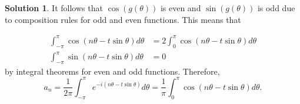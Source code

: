\documentclass[12pt]{article}
\theoremstyle{definition}
\newtheorem{sol}{Solution}
\theoremstyle{remark}
\begin{document}
\begin{sol}
It follows that $\cos(g(\theta))$ is even and $\sin(g(\theta))$ is odd due to composition rules for odd and even functions. This means that

\begin{align}
    \int_{-\pi}^\pi \cos ( n\theta - t\sin\theta )d\theta &= 2 \int_{0}^\pi \cos ( n\theta - t\sin\theta )d\theta \\
    \int_{-\pi}^{\pi} \sin( n\theta - t\sin\theta ) d\theta &= 0 
\end{align}
by integral theorems for even and odd functions. Therefore,
\begin{equation}
    a_n = \frac{1}{2\pi} \int_{-\pi}^\pi e^{-i(n\theta - t\sin\theta)}d\theta = \frac{1}{\pi} \int_{0}^\pi \cos ( n\theta - t\sin\theta )d\theta.
\end{equation}
\end{sol}
\end{document}
